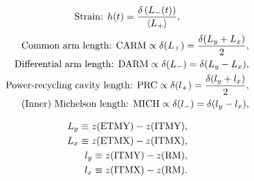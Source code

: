         \begin{eqnarray}
        \textup{Strain: } h(t) = \frac{\delta \left(L_{-}(t) \right)}{\langle L_{+}\rangle}, \label{hoftDef}
        \end{eqnarray}
        \begin{eqnarray}
        \textup{Common arm length: } \textup{CARM} \propto \delta(L_{+}) = \frac{\delta(L_y + L_x)}{2}, \label{CARMdef} \\
        \textup{Differential arm length: } \textup{DARM} \propto \delta(L_{-}) = \delta(L_y - L_x), \label{DARMdef} \\
        \textup{Power-recycling cavity length: }\textup{PRC} \propto \delta(l_{+}) = \frac{\delta(l_y + l_x)}{2}, \label{PRCdef} \\
        \textup{(Inner) Michelson length: } \textup{MICH} \propto \delta(l_{-}) = \delta(l_y - l_x), \label{MICHdef}
        \end{eqnarray}

        \begin{eqnarray}
        L_y \equiv z(\textup{ETMY}) - z(\textup{ITMY}), \label{Lydef} \\
        L_x \equiv z(\textup{ETMX}) - z(\textup{ITMX}), \label{Lxdef} \\
        l_y \equiv z(\textup{ITMY}) - z(\textup{RM}), \label{lydef} \\
        l_x \equiv z(\textup{ITMX}) - z(\textup{RM}). \label{lxdef}
        \end{eqnarray}

